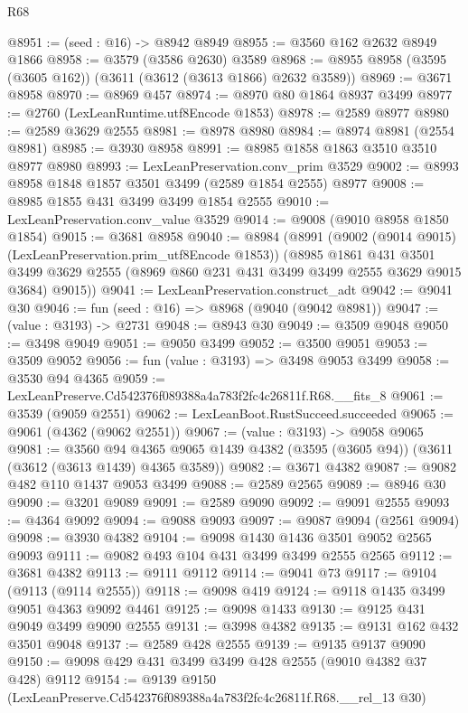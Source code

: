 \begin{lexlean}{R68}
\begin{coremodule}
@8951 := (seed : @16) -> @8942 @8949
@8955 := @3560 @162 @2632 @8949 @1866
@8958 := @3579 (@3586 @2630) @3589
@8968 := @8955 @8958 (@3595 (@3605 @162)) (@3611 (@3612 (@3613 @1866) @2632 @3589))
@8969 := @3671 @8958
@8970 := @8969 @457
@8974 := @8970 @80 @1864 @8937 @3499
@8977 := @2760 (LexLeanRuntime.utf8Encode @1853)
@8978 := @2589 @8977
@8980 := @2589 @3629 @2555
@8981 := @8978 @8980
@8984 := @8974 @8981 (@2554 @8981)
@8985 := @3930 @8958
@8991 := @8985 @1858 @1863 @3510 @3510 @8977 @8980
@8993 := LexLeanPreservation.conv_prim @3529
@9002 := @8993 @8958 @1848 @1857 @3501 @3499 (@2589 @1854 @2555) @8977
@9008 := @8985 @1855 @431 @3499 @3499 @1854 @2555
@9010 := LexLeanPreservation.conv_value @3529
@9014 := @9008 (@9010 @8958 @1850 @1854)
@9015 := @3681 @8958
@9040 := @8984
    (@8991
      (@9002 (@9014 @9015) (LexLeanPreservation.prim_utf8Encode @1853))
      (@8985
        @1861
        @431
        @3501
        @3499
        @3629
        @2555
        (@8969 @860 @231 @431 @3499 @3499 @2555 @3629 @9015 @3684)
        @9015))
@9041 := LexLeanPreservation.construct_adt
@9042 := @9041 @30
@9046 := fun (seed : @16) => @8968 (@9040 (@9042 @8981))
@9047 := (value : @3193) -> @2731
@9048 := @8943 @30
@9049 := @3509 @9048
@9050 := @3498 @9049
@9051 := @9050 @3499
@9052 := @3500 @9051
@9053 := @3509 @9052
@9056 := fun (value : @3193) => @3498 @9053 @3499
@9058 := @3530 @94 @4365
@9059 := LexLeanPreserve.Cd542376f089388a4a783f2fc4c26811f.R68.__fits_8
@9061 := @3539 (@9059 @2551)
@9062 := LexLeanBoot.RustSucceed.succeeded
@9065 := @9061 (@4362 (@9062 @2551))
@9067 := (value : @3193) -> @9058 @9065
@9081 := @3560
    @94
    @4365
    @9065
    @1439
    @4382
    (@3595 (@3605 @94))
    (@3611 (@3612 (@3613 @1439) @4365 @3589))
@9082 := @3671 @4382
@9087 := @9082 @482 @110 @1437 @9053 @3499
@9088 := @2589 @2565
@9089 := @8946 @30
@9090 := @3201 @9089
@9091 := @2589 @9090
@9092 := @9091 @2555
@9093 := @4364 @9092
@9094 := @9088 @9093
@9097 := @9087 @9094 (@2561 @9094)
@9098 := @3930 @4382
@9104 := @9098 @1430 @1436 @3501 @9052 @2565 @9093
@9111 := @9082 @493 @104 @431 @3499 @3499 @2555 @2565
@9112 := @3681 @4382
@9113 := @9111 @9112
@9114 := @9041 @73
@9117 := @9104 (@9113 (@9114 @2555))
@9118 := @9098 @419
@9124 := @9118 @1435 @3499 @9051 @4363 @9092 @4461
@9125 := @9098 @1433
@9130 := @9125 @431 @9049 @3499 @9090 @2555
@9131 := @3998 @4382
@9135 := @9131 @162 @432 @3501 @9048
@9137 := @2589 @428 @2555
@9139 := @9135 @9137 @9090
@9150 := @9098 @429 @431 @3499 @3499 @428 @2555 (@9010 @4382 @37 @428) @9112
@9154 := @9139 @9150 (LexLeanPreserve.Cd542376f089388a4a783f2fc4c26811f.R68.__rel_13 @30)

\end{coremodule}
\end{lexlean}
